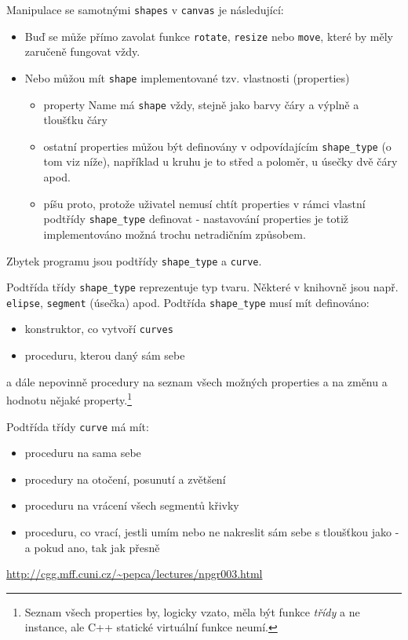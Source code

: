 \documentclass[11pt]{article} %
\begin{document}
Manipulace se samotnými \texttt{shapes} v \texttt{canvas} je následující:
\begin{itemize}
    \item Buď se může přímo zavolat funkce \texttt{rotate}, \texttt{resize} nebo \texttt{move}, které by měly zaručeně fungovat vždy.
    \item Nebo můžou mít \texttt{shape} implementované tzv. vlastnosti (properties)
    \begin{itemize}
        \item property Name má \texttt{shape} vždy, stejně jako barvy čáry a výplně a tloušťku čáry
        \item ostatní properties můžou být definovány v odpovídajícím \texttt{shape\_type} (o tom viz níže), například u kruhu je to střed a poloměr, u úsečky dvě čáry apod.
        \item {} píšu proto, protože uživatel nemusí chtít properties v rámci vlastní podtřídy \texttt{shape\_type} definovat - nastavování properties je totiž implementováno možná trochu netradičním způsobem.
    \end{itemize}
\end{itemize}
    
Zbytek programu jsou podtřídy \texttt{shape\_type} a \texttt{curve}.

Podtřída třídy \texttt{shape\_type} reprezentuje typ tvaru. Některé v knihovně jsou např. \texttt{elipse}, \texttt{segment} (úsečka) apod. Podtřída \texttt{shape\_type} musí mít definováno:
\begin{itemize}
    \item konstruktor, co vytvoří \texttt{curves}
    \item proceduru, kterou daný  sám sebe
\end{itemize}
a dále nepovinně procedury na seznam všech možných properties a na změnu a hodnotu nějaké property.\footnote{Seznam všech properties by, logicky vzato, měla být funkce \emph{třídy} a ne instance, ale C++ statické virtuální funkce neumí.}

Podtřída třídy \texttt{curve} má mít:
\begin{itemize}
    \item proceduru na  sama sebe
    \item procedury na otočení, posunutí a zvětšení
    \item proceduru na vrácení všech segmentů křivky 
    \item proceduru, co vrací, jestli umím nebo ne nakreslit sám sebe s tloušťkou jako  - a pokud ano, tak jak přesně
\end{itemize}





\begin{thebibliography}{9}

     \url{http://cgg.mff.cuni.cz/~pepca/lectures/npgr003.html}
     
 \end{thebibliography}
\end{document}
